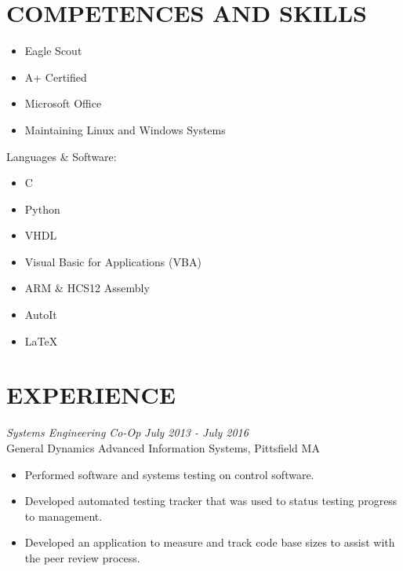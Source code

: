 \documentclass[line,margin]{res}
\begin{document}
\begin{resume}
\section{COMPETENCES AND SKILLS} 
		\begin{multicols}{2}
			\begin{itemize}
				\itemsep -2pt
				\item[] Eagle Scout
				\item[] A+ Certified
				\item[] Microsoft Office
				\item[] Maintaining Linux and Windows Systems
			\end{itemize}
		\end{multicols}
	\vspace{-10pt}
	{Languages \& Software:} %
		\begin{multicols}{2}
			\begin{itemize}
				\itemsep -2pt
				\item[] C
				\item[] Python
				\item[] VHDL
				\item[] Visual Basic for Applications (VBA)
				\item[] ARM \& HCS12 Assembly
				\item[] AutoIt
				\item[] \LaTeX 
			\end{itemize}
		\end{multicols}
\section{EXPERIENCE} 
{\sl Systems Engineering Co-Op} \hfill {\sl July 2013 - July 2016 }\\
	General Dynamics Advanced Information Systems, Pittsfield MA
	\begin{itemize}  \itemsep -2pt %
			\item Performed software and systems testing on 
				control software. 
			\item Developed automated testing tracker
				that was used to status testing progress
				to management. 
			\item Developed an application to measure and track 
				code base sizes to assist with the peer review process.
	\end{itemize}
 

\end{resume}
\end{document}
